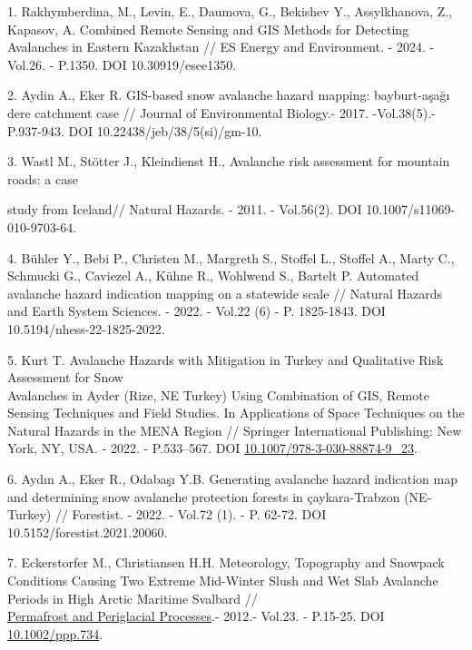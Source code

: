 \begin{references}
1. Rakhymberdina, M., Levin, E., Daumova, G., Bekishev Y., Assylkhanova,
Z., Kapasov, A. Combined Remote Sensing and GIS Methods for Detecting
Avalanches in Eastern Kazakhstan // ES Energy and Environment. - 2024. -
Vol.26. - P.1350. DOI 10.30919/esee1350.

2. Aydin A., Eker R. GIS-based snow avalanche hazard mapping:
bayburt-aşağı dere catchment case // Journal of Environmental Biology.-
2017. -Vol.38(5).- P.937-943. DOI 10.22438/jeb/38/5(si)/gm-10.

3. Wastl M., Stötter J., Kleindienst H., Avalanche risk assessment for
mountain roads: a case

study from Iceland// Natural Hazards. - 2011. - Vol.56(2). DOI
10.1007/s11069-010-9703-64.

4. Bühler Y., Bebi P., Christen M., Margreth S., Stoffel L., Stoffel A.,
Marty C., Schmucki G., Caviezel A., Kühne R., Wohlwend S., Bartelt P.
Automated avalanche hazard indication mapping on a statewide scale //
Natural Hazards and Earth System Sciences. - 2022. - Vol.22 (6) - P.
1825-1843. DOI 10.5194/nhess-22-1825-2022.

5. Kurt T. Avalanche Hazards with Mitigation in Turkey and Qualitative
Risk Assessment for Snow \\Avalanches in Ayder (Rize, NE Turkey) Using
Combination of GIS, Remote Sensing Techniques and Field Studies. In
Applications of Space Techniques on the Natural Hazards in the MENA
Region // Springer International Publishing: New York, NY, USA. - 2022.
- P.533--567. DOI
\href{http://dx.doi.org/10.1007/978-3-030-88874-9_23}{10.1007/978-3-030-88874-9\_23}.

6. Aydın A., Eker R., Odabaşı Y.B. Generating avalanche hazard
indication map and determining snow avalanche protection forests in
çaykara-Trabzon (NE-Turkey) // Forestist. - 2022. - Vol.72 (1). - P.
62-72. DOI 10.5152/forestist.2021.20060.

7. Eckerstorfer M., Christiansen H.H. Meteorology, Topography and
Snowpack Conditions Causing Two Extreme Mid-Winter Slush and Wet Slab
Avalanche Periods in High Arctic Maritime Svalbard //\\
\href{https://www.researchgate.net/journal/Permafrost-and-Periglacial-Processes-1099-1530?_tp=eyJjb250ZXh0Ijp7ImZpcnN0UGFnZSI6InB1YmxpY2F0aW9uIiwicGFnZSI6InB1YmxpY2F0aW9uIn19}{Permafrost
and Periglacial Processes}.- 2012.- Vol.23. - P.15-25. DOI
\href{http://dx.doi.org/10.1002/ppp.734}{10.1002/ppp.734}.


\end{references}
